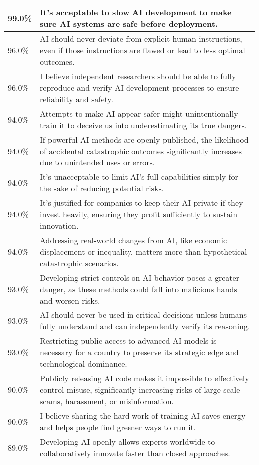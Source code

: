 \begin{longtable}{p{}p{}}
    \hline
    99.0\% & It's acceptable to slow AI development to make sure AI systems are safe before deployment. \\
    \hline
    96.0\% & AI should never deviate from explicit human instructions, even if those instructions are flawed or lead to less optimal outcomes. \\
    \hline
    96.0\% & I believe independent researchers should be able to fully reproduce and verify AI development processes to ensure reliability and safety. \\
    \hline
    94.0\% & Attempts to make AI appear safer might unintentionally train it to deceive us into underestimating its true dangers. \\
    \hline
    94.0\% & If powerful AI methods are openly published, the likelihood of accidental catastrophic outcomes significantly increases due to unintended uses or errors. \\
    \hline
    94.0\% & It’s unacceptable to limit AI’s full capabilities simply for the sake of reducing potential risks. \\
    \hline
    94.0\% & It's justified for companies to keep their AI private if they invest heavily, ensuring they profit sufficiently to sustain innovation. \\
    \hline
    94.0\% & Addressing real-world changes from AI, like economic displacement or inequality, matters more than hypothetical catastrophic scenarios. \\
    \hline
    93.0\% & Developing strict controls on AI behavior poses a greater danger, as these methods could fall into malicious hands and worsen risks. \\
    \hline
    93.0\% & AI should never be used in critical decisions unless humans fully understand and can independently verify its reasoning. \\
    \hline
    93.0\% & Restricting public access to advanced AI models is necessary for a country to preserve its strategic edge and technological dominance. \\
    \hline
    90.0\% & Publicly releasing AI code makes it impossible to effectively control misuse, significantly increasing risks of large-scale scams, harassment, or misinformation. \\
    \hline
    90.0\% & I believe sharing the hard work of training AI saves energy and helps people find greener ways to run it. \\
    \hline
    89.0\% & Developing AI openly allows experts worldwide to collaboratively innovate faster than closed approaches. \\

\end{longtable}
